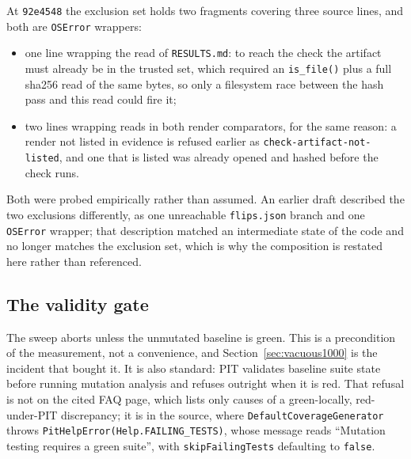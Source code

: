\documentclass[11pt]{article}
\begin{document}
At \texttt{92e4548} the exclusion set holds two fragments covering three source lines, and
both are \texttt{OSError} wrappers:

\begin{itemize}
\item one line wrapping the read of \texttt{RESULTS.md}: to reach the check the artifact must
already be in the trusted set, which required an \texttt{is\_file()} plus a full sha256 read
of the same bytes, so only a filesystem race between the hash pass and this read could fire
it;
\item two lines wrapping reads in both render comparators, for the same reason: a render not
listed in evidence is refused earlier as \texttt{check-artifact-not-listed}, and one that is
listed was already opened and hashed before the check runs.
\end{itemize}

Both were probed empirically rather than assumed. An earlier draft described the two
exclusions differently, as one unreachable \texttt{flips.json} branch and one \texttt{OSError}
wrapper; that description matched an intermediate state of the code and no longer matches the
exclusion set, which is why the composition is restated here rather than referenced.

\subsection{The validity gate}
\label{sec:gate}

The sweep aborts unless the unmutated baseline is green. This is a precondition of the
measurement, not a convenience, and Section~\ref{sec:vacuous1000} is the incident that
bought it. It is also standard: PIT validates baseline suite state before running mutation
analysis \citep{pitest_faq} and refuses outright when it is red. That refusal is not on the
cited FAQ page, which lists only causes of a green-locally, red-under-PIT discrepancy; it is
in the source, where \texttt{DefaultCoverageGenerator} throws
\texttt{PitHelpError(Help.FAILING\_TESTS)}, whose message reads ``Mutation testing requires a
green suite'', with \texttt{skipFailingTests} defaulting to \texttt{false}.
\end{document}
